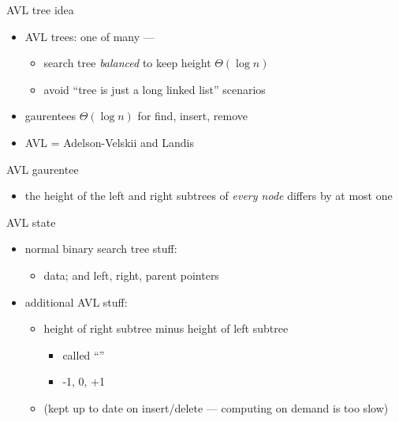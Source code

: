 \usetikzlibrary{graphs,graphdrawing}


\begin{frame}{AVL tree idea}
\begin{itemize}
\item AVL trees: one of many  ---
    \begin{itemize}
    \item search tree \textit{balanced} to keep height $\Theta(\log n)$
    \item avoid ``tree is just a long linked list'' scenarios
    \end{itemize}
\item gaurentees $\Theta(\log n)$ for find, insert, remove
\item AVL = Adelson-Velskii and Landis
\end{itemize}
\end{frame}

\begin{frame}{AVL gaurentee}
\begin{itemize}
\item the height of the left and right subtrees of \textit{every node} differs by at most one
\end{itemize}
\end{frame}

\begin{frame}{AVL state}
\begin{itemize}
\item normal binary search tree stuff:
\begin{itemize}
    \item data; and left, right, parent pointers
\end{itemize}
\item additional AVL stuff:
\begin{itemize}
    \item height of right subtree minus height of left subtree
        \begin{itemize}
        \item called ``''
        \item -1, 0, +1
        \end{itemize}
    \item (kept up to date  on insert/delete --- computing on demand is too slow)
    \end{itemize}
\end{itemize}
\end{frame}

